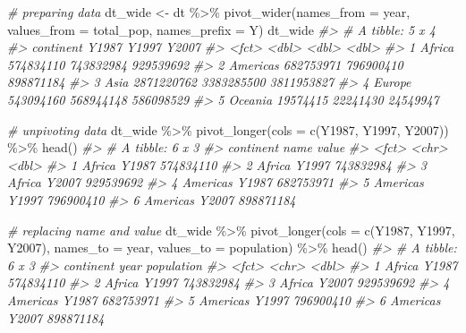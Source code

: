 \documentclass[
]{book}
\newenvironment{Shaded}{\begin{snugshade}}{\end{snugshade}}
\newcommand{\AttributeTok}[1]{\textcolor[rgb]{0.77,0.63,0.00}{#1}}
\newcommand{\CommentTok}[1]{\textcolor[rgb]{0.56,0.35,0.01}{\textit{#1}}}
\newcommand{\FunctionTok}[1]{\textcolor[rgb]{0.00,0.00,0.00}{#1}}
\newcommand{\NormalTok}[1]{#1}
\newcommand{\OtherTok}[1]{\textcolor[rgb]{0.56,0.35,0.01}{#1}}
\newcommand{\SpecialCharTok}[1]{\textcolor[rgb]{0.00,0.00,0.00}{#1}}
\newcommand{\StringTok}[1]{\textcolor[rgb]{0.31,0.60,0.02}{#1}}
\begin{document}
\begin{Shaded}
\begin{Highlighting}[]
\CommentTok{\# preparing data }
\NormalTok{dt\_wide }\OtherTok{\textless{}{-}}
\NormalTok{dt }\SpecialCharTok{\%\textgreater{}\%}
  \FunctionTok{pivot\_wider}\NormalTok{(}\AttributeTok{names\_from =}\NormalTok{ year, }\AttributeTok{values\_from =}\NormalTok{ total\_pop, }\AttributeTok{names\_prefix =} \StringTok{\textquotesingle{}Y\textquotesingle{}}\NormalTok{)}
\NormalTok{dt\_wide}
\CommentTok{\#\textgreater{} \# A tibble: 5 x 4}
\CommentTok{\#\textgreater{}   continent      Y1987      Y1997      Y2007}
\CommentTok{\#\textgreater{}   \textless{}fct\textgreater{}          \textless{}dbl\textgreater{}      \textless{}dbl\textgreater{}      \textless{}dbl\textgreater{}}
\CommentTok{\#\textgreater{} 1 Africa     574834110  743832984  929539692}
\CommentTok{\#\textgreater{} 2 Americas   682753971  796900410  898871184}
\CommentTok{\#\textgreater{} 3 Asia      2871220762 3383285500 3811953827}
\CommentTok{\#\textgreater{} 4 Europe     543094160  568944148  586098529}
\CommentTok{\#\textgreater{} 5 Oceania     19574415   22241430   24549947}

\CommentTok{\# unpivoting data}
\NormalTok{dt\_wide }\SpecialCharTok{\%\textgreater{}\%}
  \FunctionTok{pivot\_longer}\NormalTok{(}\AttributeTok{cols =} \FunctionTok{c}\NormalTok{(Y1987, Y1997, Y2007)) }\SpecialCharTok{\%\textgreater{}\%}
  \FunctionTok{head}\NormalTok{()}
\CommentTok{\#\textgreater{} \# A tibble: 6 x 3}
\CommentTok{\#\textgreater{}   continent name      value}
\CommentTok{\#\textgreater{}   \textless{}fct\textgreater{}     \textless{}chr\textgreater{}     \textless{}dbl\textgreater{}}
\CommentTok{\#\textgreater{} 1 Africa    Y1987 574834110}
\CommentTok{\#\textgreater{} 2 Africa    Y1997 743832984}
\CommentTok{\#\textgreater{} 3 Africa    Y2007 929539692}
\CommentTok{\#\textgreater{} 4 Americas  Y1987 682753971}
\CommentTok{\#\textgreater{} 5 Americas  Y1997 796900410}
\CommentTok{\#\textgreater{} 6 Americas  Y2007 898871184}

\CommentTok{\# replacing name and value}
\NormalTok{dt\_wide }\SpecialCharTok{\%\textgreater{}\%}
  \FunctionTok{pivot\_longer}\NormalTok{(}\AttributeTok{cols =} \FunctionTok{c}\NormalTok{(Y1987, Y1997, Y2007), }\AttributeTok{names\_to =} \StringTok{\textquotesingle{}year\textquotesingle{}}\NormalTok{, }\AttributeTok{values\_to =} \StringTok{\textquotesingle{}population\textquotesingle{}}\NormalTok{) }\SpecialCharTok{\%\textgreater{}\%}
  \FunctionTok{head}\NormalTok{()}
\CommentTok{\#\textgreater{} \# A tibble: 6 x 3}
\CommentTok{\#\textgreater{}   continent year  population}
\CommentTok{\#\textgreater{}   \textless{}fct\textgreater{}     \textless{}chr\textgreater{}      \textless{}dbl\textgreater{}}
\CommentTok{\#\textgreater{} 1 Africa    Y1987  574834110}
\CommentTok{\#\textgreater{} 2 Africa    Y1997  743832984}
\CommentTok{\#\textgreater{} 3 Africa    Y2007  929539692}
\CommentTok{\#\textgreater{} 4 Americas  Y1987  682753971}
\CommentTok{\#\textgreater{} 5 Americas  Y1997  796900410}
\CommentTok{\#\textgreater{} 6 Americas  Y2007  898871184}
\end{Highlighting}
\end{Shaded}
\end{document}
